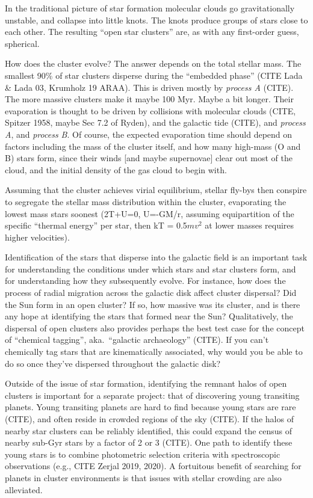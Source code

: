 \documentclass[12pt,twocolumn,tighten]{aastex63}
\begin{document}
In the traditional picture of star formation molecular clouds go
gravitationally unstable, and collapse into little knots.  The knots
produce groups of stars close to each other.  The resulting ``open star
clusters'' are, as with any first-order guess, spherical.

How does the cluster evolve?  The answer depends on the total stellar
mass.  The smallest 90\% of star clusters disperse during the ``embedded
phase'' (CITE Lada \& Lada 03, Krumholz 19 ARAA).  This is driven mostly
by {\it process A} (CITE).  The more massive clusters make it maybe 100
Myr. Maybe a bit longer.  Their evaporation is thought to be driven by
collisions with molecular clouds (CITE, Spitzer 1958, maybe Sec 7.2 of
Ryden), and the galactic tide (CITE), and {\it process A}, and {\it
process B}.  Of course, the expected evaporation time should depend on
factors including the mass of the cluster itself, and how many high-mass
(O and B) stars form, since their winds [and maybe supernovae] clear out
most of the cloud, and the initial density of the gas cloud to begin
with.

Assuming that the cluster achieves virial equilibrium, stellar fly-bys
then conspire to segregate the stellar mass distribution within the
cluster, evaporating the lowest mass stars soonest (2T+U=0, U=-GM/r,
assuming equipartition of the specific ``thermal energy'' per star, then
kT = 0.5$mv^2$ at lower masses requires higher velocities).  

Identification of the stars that disperse into the galactic field is an
important task for understanding the conditions under which stars and
star clusters form, and for understanding how they subsequently evolve.
For instance, how does the process of radial migration across the
galactic disk affect cluster dispersal?  Did the Sun form in an open
cluster? If so, how massive was its cluster, and is there any hope at
identifying the stars that formed near the Sun?  Qualitatively, the
dispersal of open clusters also provides perhaps the best test case for
the concept of ``chemical tagging'', aka.\ ``galactic archaeology''
(CITE).  If you can't chemically tag stars that are kinematically
associated, why would you be able to do so once they've dispersed
throughout the galactic disk?

Outside of the issue of star formation, identifying the remnant halos of
open clusters is important for a separate project: that of discovering
young transiting planets.  Young transiting planets are hard to find
because young stars are rare (CITE), and often reside in crowded regions
of the sky (CITE).  If the halos of nearby star clusters can be reliably
identified, this could expand the census of nearby sub-Gyr stars by a
factor of 2 or 3 (CITE).  
One path to identify these young stars is to combine photometric
selection criteria with spectroscopic observations (e.g., CITE Zerjal
2019, 2020).
A fortuitous benefit of searching for planets
in cluster environments is that issues with stellar crowding are also
alleviated.
\end{document}
